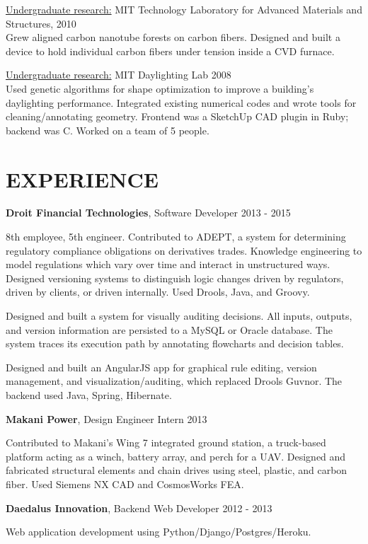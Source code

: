 \documentclass[margin]{res}
\begin{document}
\begin{resume}
		\underline{Undergraduate research:} MIT Technology Laboratory for Advanced Materials and Structures, 2010 \\
		Grew aligned carbon nanotube forests on carbon fibers. Designed and built a device to hold individual carbon fibers under tension inside a CVD furnace.

		\underline{Undergraduate research:} MIT Daylighting Lab \hfill 2008 \\
		Used genetic algorithms for shape optimization to improve a building's daylighting performance. Integrated existing numerical codes and wrote tools for cleaning/annotating geometry. Frontend was a SketchUp CAD plugin in Ruby; backend was C. Worked on a team of 5 people. 


	\section{EXPERIENCE}

		{\bf Droit Financial Technologies}, Software Developer \hfill 2013 - 2015
		
		8th employee, 5th engineer. Contributed to ADEPT, a system for determining regulatory compliance obligations on derivatives trades. Knowledge engineering to model regulations which vary over time and interact in unstructured ways. Designed versioning systems to distinguish logic changes driven by regulators, driven by clients, or driven internally. Used Drools, Java, and Groovy.

		Designed and built a system for visually auditing decisions. All inputs, outputs, and version information are persisted to a MySQL or Oracle database. The system traces its execution path by annotating flowcharts and decision tables.

		Designed and built an AngularJS app for 	graphical rule editing, version management, and visualization/auditing, which replaced Drools Guvnor. The backend used Java, Spring, Hibernate.
	

		{\bf Makani Power}, Design Engineer Intern \hfill 2013

		Contributed to Makani's Wing 7 integrated ground station, a truck-based platform acting as a winch, battery array, and perch for a UAV. Designed and fabricated structural elements and chain drives using steel, plastic, and carbon fiber. Used Siemens NX CAD and CosmosWorks FEA.

		 {\bf Daedalus Innovation}, Backend Web Developer \hfill 2012 - 2013

		 Web application development using Python/Django/Postgres/Heroku.



\end{resume}
\end{document}
